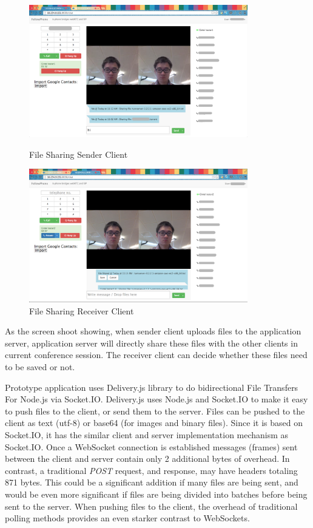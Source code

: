 \begin{figure}
	\centering
    	\includegraphics[width=0.85\textwidth,natwidth=610,natheight=642]{figs/webgui_file_share_sender.png}
  	\caption{File Sharing Sender Client}
  	\label{fig:webgui_file_share_sender}
  	    \includegraphics[width=0.85\textwidth,natwidth=610,natheight=642]{figs/webgui_file_share_receiver.png}
  	\caption{File Sharing Receiver Client}
  	\label{fig:webgui_file_share_receiver}
\end{figure}

\par As the screen shoot showing, when sender client uploads files to the application server, application server will directly share these files with the other clients in current conference session. The receiver client can decide whether these files need to be saved or not.

\par Prototype application uses Delivery.js library to do bidirectional File Transfers For Node.js via Socket.IO. Delivery.js uses Node.js and Socket.IO to make it easy to push files to the client, or send them to the server. Files can be pushed to the client as text (utf-8) or base64 (for images and binary files).\cite{github:deliveryjs} Since it is based on Socket.IO, it has the similar client and server implementation mechanism as Socket.IO. Once a WebSocket connection is established messages (frames) sent between the client and server contain only 2 additional bytes of overhead. In contrast, a traditional \textit{POST} request, and response, may have headers totaling 871 bytes. This could be a significant addition if many files are being sent, and would be even more significant if files are being divided into batches before being sent to the server. When pushing files to the client, the overhead of traditional polling methods provides an even starker contrast to WebSockets.

